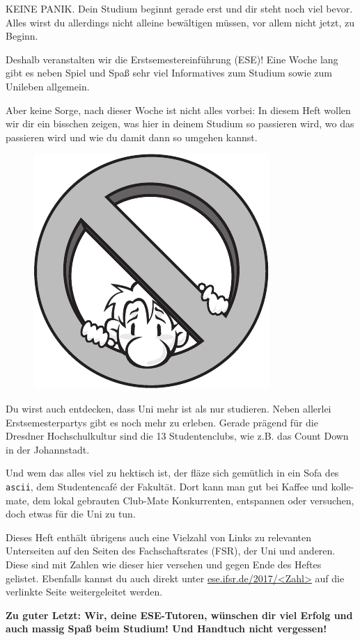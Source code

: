 
KEINE PANIK. 
Dein Studium beginnt gerade erst und dir steht noch viel bevor.
Alles wirst du allerdings nicht alleine bewältigen müssen, vor allem nicht jetzt, zu Beginn.

Deshalb veranstalten wir die Erstsemestereinführung (ESE)!
Eine Woche lang gibt es neben Spiel und Spaß sehr viel Informatives zum Studium sowie zum Unileben allgemein.

Aber keine Sorge, nach dieser Woche ist nicht alles vorbei: In diesem Heft wollen wir dir ein bisschen zeigen, was hier in deinem Studium so passieren wird, wo das passieren wird und wie du damit dann so umgehen kannst.

\begin{figure}%
	\includegraphics[width=.96\linewidth]{img/KarlchenIntro}
\end{figure}
  \vspace*{1.5em}
Du wirst auch entdecken, dass Uni mehr ist als nur studieren.
Neben allerlei Erstsemesterpartys gibt es noch mehr zu erleben.
Gerade prägend für die Dresdner Hochschulkultur sind die 13 Studentenclubs, wie z.B. das Count Down in der Johannstadt.

Und wem das alles viel zu hektisch ist, der fläze sich gemütlich in ein Sofa des \texttt{ascii}, dem Studentencafé der Fakultät. 
Dort kann man gut bei Kaffee und kolle-mate, dem lokal gebrauten Club-Mate Konkurrenten,  entspannen oder versuchen, doch etwas für die Uni zu tun.

Dieses Heft enthält übrigens auch eine Vielzahl von Links zu relevanten Unterseiten auf den Seiten des Fachschaftsrates (FSR), der Uni und anderen.
Diese sind mit Zahlen wie dieser hier  versehen und gegen Ende des Heftes gelistet. Ebenfalls kannst du auch direkt unter \url{ese.ifsr.de/2017/<Zahl>} auf die verlinkte Seite weitergeleitet werden.

\textbf{Zu guter Letzt: Wir, deine ESE-Tutoren, wünschen dir viel Erfolg und auch massig Spaß beim Studium! Und Handtuch nicht vergessen!}
